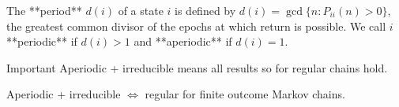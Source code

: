 \begin{definition}
The **period** $d(i)$ of a state $i$ is defined by $d(i) = \gcd\{n : P_{ii}(n) > 0\}$, the greatest common divisor of the epochs at which return is possible. We call $i$ **periodic** if $d(i) > 1$ and **aperiodic** if $d(i) = 1$.
\end{definition}

\begin{newnotion}{Important}
Aperiodic + irreducible means all results so for regular chains hold.
\end{newnotion}

\begin{remark}
Aperiodic + irreducible $\Leftrightarrow$ regular for finite outcome Markov chains.
\end{remark}


